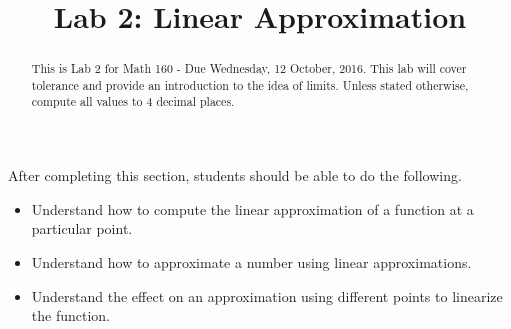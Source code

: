 \documentclass{ximera}
\title{Lab 2: Linear Approximation}
\begin{document}
\begin{abstract}
This is Lab 2 for Math 160 - Due Wednesday, 12 October, 2016. This lab will cover tolerance and provide an introduction to the idea of limits. Unless stated otherwise, compute all values to $4$ decimal places.
\end{abstract}

\maketitle

\begin{sectionOutcomes}

After completing this section, students should be able to do the following.

\begin{itemize}
	\item Understand how to compute the linear approximation of a function at a particular point.
    \item Understand how to approximate a number using linear approximations.
    \item Understand the effect on an approximation using different points to linearize the function.
\end{itemize}

\end{sectionOutcomes}
\end{document}
